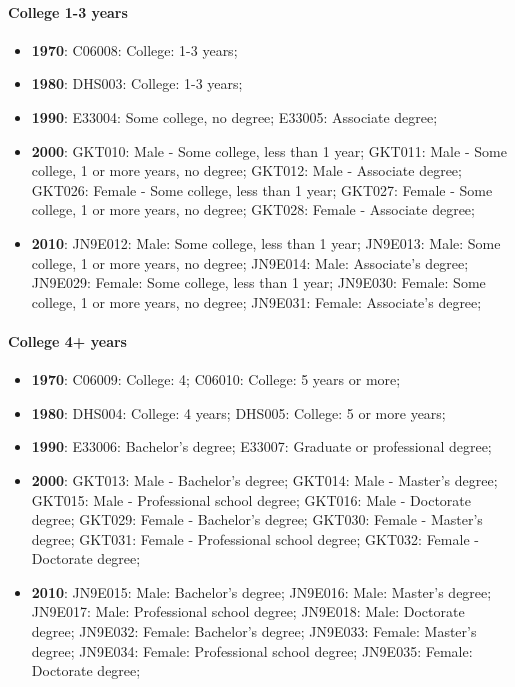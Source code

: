 \documentclass[a4paper]{article}
\begin{document}
\paragraph{College 1-3 years}
\begin{itemize}
   \item{\textbf{1970}:  C06008: College: 1-3 years;}
   \item{\textbf{1980}:  DHS003: College: 1-3 years;}
   \item{\textbf{1990}:  E33004: Some college, no degree; E33005: Associate degree;}
   \item{\textbf{2000}:  GKT010: Male - Some college, less than 1 year; GKT011: Male - Some college, 1 or more years, no degree; GKT012: Male - Associate degree; GKT026: Female - Some college, less than 1 year; GKT027: Female - Some college, 1 or more years, no degree; GKT028: Female - Associate degree;}
   \item{\textbf{2010}:  JN9E012: Male: Some college, less than 1 year; JN9E013: Male: Some college, 1 or more years, no degree; JN9E014: Male: Associate's degree; JN9E029: Female: Some college, less than 1 year; JN9E030: Female: Some college, 1 or more years, no degree; JN9E031: Female: Associate's degree;}
\end{itemize}

\paragraph{College 4+ years}
\begin{itemize}
   \item{\textbf{1970}:  C06009: College: 4; C06010: College: 5 years or more;}
   \item{\textbf{1980}:  DHS004: College: 4 years; DHS005: College: 5 or more years;}
   \item{\textbf{1990}:  E33006: Bachelor's degree; E33007: Graduate or professional degree;}
   \item{\textbf{2000}:  GKT013: Male - Bachelor's degree; GKT014: Male - Master's degree; GKT015: Male - Professional school degree; GKT016: Male - Doctorate degree; GKT029: Female - Bachelor's degree; GKT030: Female - Master's degree; GKT031: Female - Professional school degree; GKT032: Female - Doctorate degree;}
   \item{\textbf{2010}:  JN9E015: Male: Bachelor's degree; JN9E016: Male: Master's degree; JN9E017: Male: Professional school degree; JN9E018: Male: Doctorate degree; JN9E032: Female: Bachelor's degree; JN9E033: Female: Master's degree; JN9E034: Female: Professional school degree; JN9E035: Female: Doctorate degree;}
\end{itemize}
\end{document}
